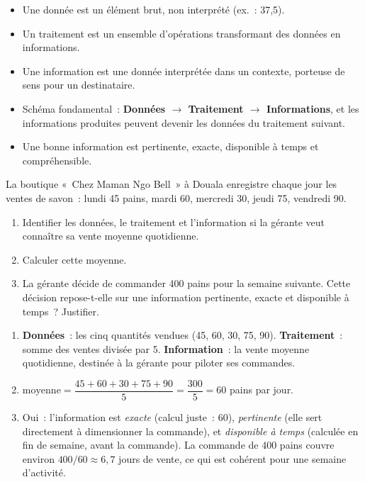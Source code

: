 \documentclass[11pt]{article}
\newcommand{\cle}[1]{{\popxbold\color{popdark}#1}}
\begin{document}
\begin{aretenir}
\begin{itemize}
\item Une \cle{donnée} est un élément brut, non interprété (ex.~: 37,5).
\item Un \cle{traitement} est un ensemble d'opérations transformant des données en informations.
\item Une \cle{information} est une donnée interprétée dans un contexte, porteuse de sens pour un destinataire.
\item Schéma fondamental~: \textbf{Données $\rightarrow$ Traitement $\rightarrow$ Informations}, et les informations produites peuvent devenir les données du traitement suivant.
\item Une bonne information est \cle{pertinente}, \cle{exacte}, \cle{disponible à temps} et \cle{compréhensible}.
\end{itemize}
\end{aretenir}

\begin{exercice}
La boutique «~Chez Maman Ngo Bell~» à Douala enregistre chaque jour les ventes de savon~: lundi 45 pains, mardi 60, mercredi 30, jeudi 75, vendredi 90.
\begin{enumerate}
\item Identifier les données, le traitement et l'information si la gérante veut connaître sa vente moyenne quotidienne.
\item Calculer cette moyenne.
\item La gérante décide de commander 400 pains pour la semaine suivante. Cette décision repose-t-elle sur une information pertinente, exacte et disponible à temps~? Justifier.
\end{enumerate}
\end{exercice}

\begin{corrige}
\begin{enumerate}
\item \textbf{Données}~: les cinq quantités vendues (45, 60, 30, 75, 90). \textbf{Traitement}~: somme des ventes divisée par 5. \textbf{Information}~: la vente moyenne quotidienne, destinée à la gérante pour piloter ses commandes.
\item $\text{moyenne} = \dfrac{45 + 60 + 30 + 75 + 90}{5} = \dfrac{300}{5} = 60$ pains par jour.
\item Oui~: l'information est \emph{exacte} (calcul juste~: 60), \emph{pertinente} (elle sert directement à dimensionner la commande), et \emph{disponible à temps} (calculée en fin de semaine, avant la commande). La commande de 400 pains couvre environ $400 / 60 \approx 6,7$ jours de vente, ce qui est cohérent pour une semaine d'activité.
\end{enumerate}
\end{corrige}
\end{document}

